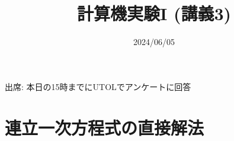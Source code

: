 \documentclass[10pt,dvipdfmx]{beamer}
\title{計算機実験I (講義3)}
\date{2024/06/05}
\begin{document}
\begin{frame}
  \titlepage
  \tableofcontents
  出席: 本日の15時までにUTOLでアンケートに回答
\end{frame}





\section{連立一次方程式の直接解法}







%
%
%
%


%





















\section{}

\end{document}
